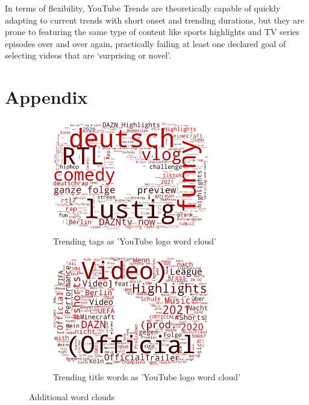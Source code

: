\documentclass{article}
\begin{document}
In terms of flexibility, YouTube Trends are theoretically capable of quickly adapting to current trends with short onset and trending durations, but they are prone to featuring the same type of content like sports highlights and TV series episodes over and over again, practically failing at least one declared goal of selecting videos that are ‘surprising or novel'.

\printbibliography

\newpage
\appendix
\section{Appendix}
\begin{figure}[h]
\centering
\begin{subfigure}{.5\textwidth}
    \centering
    \includegraphics[width=0.75\textwidth]{fig/tags_wordcloud_nice.png}
    \caption{Trending tags as 'YouTube logo word cloud'}
    \label{fig:wc_tags}
\end{subfigure}%
\begin{subfigure}{.5\textwidth}
    \centering
    \includegraphics[width=0.75\textwidth]{fig/titles_wordcloud_nice.png}
    \caption{Trending title words as 'YouTube logo word cloud'}
    \label{fig:wc_titles}
\end{subfigure}
\caption{Additional word clouds}
\label{fig:wc_appendix}
\end{figure}
\end{document}
